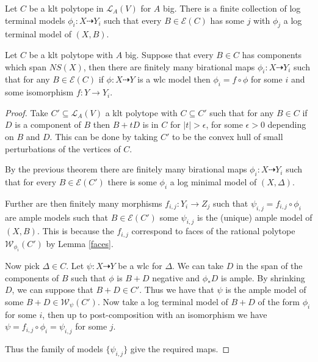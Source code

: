 \documentclass[a4paper,12pt]{amsart}
\begin{document}
	\begin{theorem}\cite[Theorem 9.34]{bhatt2020globally+}
		Let $C$ be a klt polytope in $\mathcal{L}_{A}(V)$ for $A$ big. There is a finite collection of log terminal models $\phi_{i}: X \dashrightarrow Y_{i}$ such that  every $B \in \mathcal{E}(C)$ has some $j$ with $\phi_{j}$ a log terminal model of $(X,B)$. 
	\end{theorem}
	

	
	\begin{corollary}\label{klt_finiteness}
		Let $C$ be a klt polytope with $A$ big. Suppose that every $B \in C$ has components which span $NS(X)$, then there are finitely many birational maps $\phi_{i}: X \dashrightarrow Y_{i}$ such that for any $B \in \mathcal{E}(C)$ if $\phi: X \dashrightarrow Y$ is a wlc model then $\phi_{i}=f \circ \phi$ for some $i$ and some isomorphism $f: Y \to Y_{i}$.
	\end{corollary}
	
	\begin{proof}
		
		Take $C'\subseteq \mathcal{L}_{A}(V)$ a klt polytope with $C \subseteq C'$ such that for any $B \in C$ if $D$ is a component of $B$ then $B+tD$ is in $C$ for $|t| > \epsilon$, for some $\epsilon >0$ depending on $B$ and $D$. This can be done by taking $C'$ to be the convex hull of small perturbations of the vertices of $C$.
		
		By the previous theorem there are finitely many birational maps $\phi_{i}: X \dashrightarrow Y_{i}$ such that for every $B \in \mathcal{E}(C')$ there is some $\phi_{i}$ a log minimal model of $(X,\Delta)$.
		
		Further are then finitely many morphisms $f_{i,j}:Y_{i}\to Z_{j}$ such that $\psi_{i,j}=f_{i,j} \circ \phi_{i}$ are ample models such that $B \in \mathcal{E}(C')$ some $\psi_{i,j}$ is the (unique) ample model of $(X,B)$. This is because the $f_{i,j}$ correspond to faces of the rational polytope $\mathcal{W}_{\phi_{i}}(C')$ by Lemma \ref{faces}.
		
		Now pick $\Delta \in C$. Let $\psi: X \dashrightarrow Y$ be a wlc for $\Delta$. We can take $D$ in the span of the components of $B$ such that $\phi$ is $B+D$ negative and $\phi_{*}D$ is ample. By shrinking $D$, we can suppose that $B+D\in C'$. Thus we have that $\psi$ is the ample model of some $B+D \in \mathcal{W}_{\psi}(C')$. Now take a log terminal model of $B+D$ of the form $\phi_{i}$ for some $i$, then up to post-composition with an isomorphism we have $\psi=f_{i,j} \circ \phi_{i}=\psi_{i,j}$ for some $j$. 
		
		Thus the family of models $\{\psi_{i,j}\}$ give the required maps.
		
	\end{proof}
\end{document}
